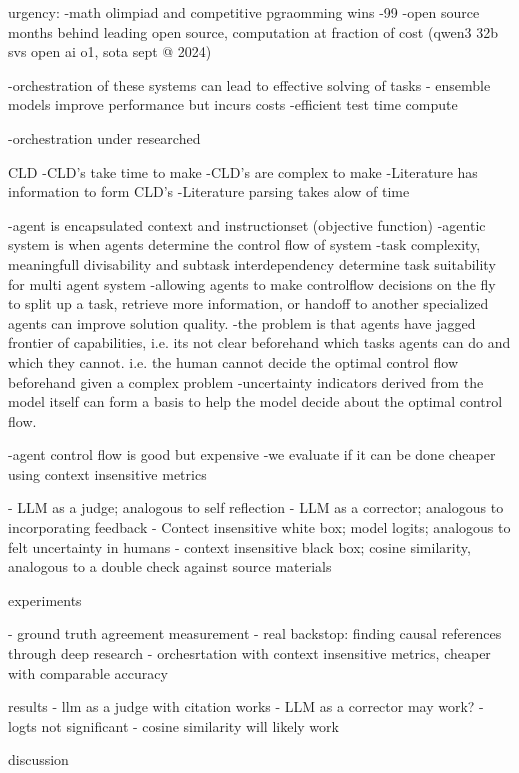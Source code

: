 
urgency:
-math olimpiad and competitive pgraomming wins
-99%
-open source months behind leading open source, computation at fraction of cost (qwen3 32b svs open ai o1, sota sept @ 2024)

-orchestration of these systems can lead to effective solving of tasks
- ensemble models improve performance but incurs costs
-efficient test time compute 

-orchestration under researched


CLD
-CLD's take time to make
-CLD's are complex to make
-Literature has information to form CLD's
-Literature parsing takes alow of time


-agent is encapsulated context and instructionset (objective function)
-agentic system is when agents determine the control flow of system
-task complexity, meaningfull divisability and subtask interdependency determine task suitability for multi agent system
-allowing agents to make controlflow decisions on the fly to split up a task, retrieve more information, or handoff to another specialized agents can improve solution quality.
-the problem is that agents have jagged frontier of capabilities, i.e. its not clear beforehand which tasks agents can do and which they cannot. i.e. the human cannot decide the optimal control flow beforehand given a complex problem
-uncertainty indicators derived from the model itself can form a basis to help the model decide about the optimal control flow.

-agent control flow is good but expensive
-we evaluate if it can be done cheaper using context insensitive metrics

    - LLM as a judge; analogous to self reflection
    - LLM as a corrector; analogous to incorporating feedback
    - Contect insensitive white box; model logits; analogous to felt uncertainty in humans
    - context insensitive black box; cosine similarity, analogous to a double check against source materials


experiments

- ground truth agreement measurement
- real backstop: finding causal references through deep research
- orchesrtation with context insensitive metrics, cheaper with comparable accuracy




results
- llm as a judge with citation works
- LLM as a corrector may work?
- logts not significant
- cosine similarity will likely work

discussion

